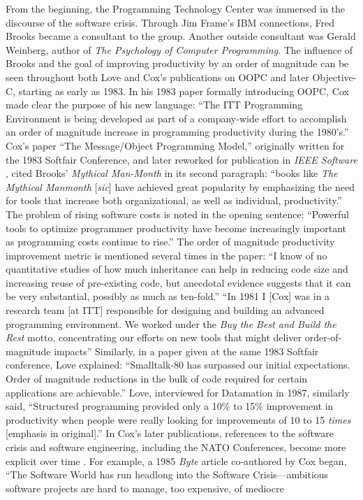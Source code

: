 \documentclass[acmsmall]{acmart}\settopmatter{}
\begin{document}
From the beginning, the Programming Technology Center was immersed in the discourse of the software crisis. Through Jim Frame's IBM connections, Fred Brooks became a consultant to the group. Another outside consultant was Gerald Weinberg, author of \emph{The Psychology of Computer Programming}. The influence of Brooks and the goal of improving productivity by an order of magnitude can be seen throughout both Love and Cox's publications on OOPC and later Objective-C, starting as early as 1983. In his 1983 paper formally introducing OOPC, Cox made clear the purpose of his new language: ``The ITT Programming Environment is being developed as part of a company-wide effort to accomplish an order of magnitude increase in programming productivity during the 1980's.'' \citep[15]{cox_object_1983} Cox's paper ``The Message/Object Programming Model,'' originally written for the 1983 Softfair Conference, and later reworked for publication in \emph{IEEE Software} \citetext{\citealp[51]{cox_message/object_1983}; \citealp[50]{cox_message/object_1984}}, cited Brooks' \emph{Mythical Man-Month} \citep{brooks_mythical_1975} in its second paragraph: ``books like \emph{The Mythical Manmonth} [\emph{sic}] have achieved great popularity by emphasizing the need for tools that increase both organizational, as well as individual, productivity.'' The problem of rising software costs is noted in the opening sentence: ``Powerful tools to optimize programmer productivity have become increasingly important as programming costs continue to rise.''  The order of magnitude productivity improvement metric is mentioned several times in the paper: ``I know of no quantitative studies of how much inheritance can help in reducing code size and increasing reuse of pre-existing code, but anecdotal evidence suggests that it can be very substantial, possibly as much as ten-fold.'' \citep[56]{cox_message/object_1983} ``In 1981 I [Cox] was in a research team [at ITT] responsible for designing and building an advanced programming environment. We worked under the \emph{Buy the Best and Build the Rest} motto, concentrating our efforts on new tools that might deliver order-of-magnitude impacts'' \citep[57]{cox_message/object_1983} Similarly, in a paper given at the same 1983 Softfair conference, Love explained: ``Smalltalk-80 has surpassed our initial expectations. Order of magnitude reductions in the bulk of code required for certain applications are achievable.'' \citep[61]{love_experiences_1983} Love, interviewed for Datamation in 1987, similarly said, ``Structured programming\textellipsis{} provided only a 10\% to 15\% improvement in productivity when people were really looking for improvements of 10 to 15 \emph{times} [emphasis in original].'' \citep{verity_oops_1987} In Cox's later publications, references to the software crisis and software engineering, including the NATO Conferences, become more explicit over time \citetext{\citealp[3]{cox_object-oriented_1986};  \citealp[25]{cox_planning_1990}; \citealp[209]{cox_there_1990}; \citealp[iii--iv, 3]{cox_object-oriented_1991}}. For example, a 1985 \emph{Byte} article co-authored by Cox began, ``The Software World has run headlong into the Software Crisis---ambitious software projects are hard to manage, too expensive, of mediocre 
\end{document}
